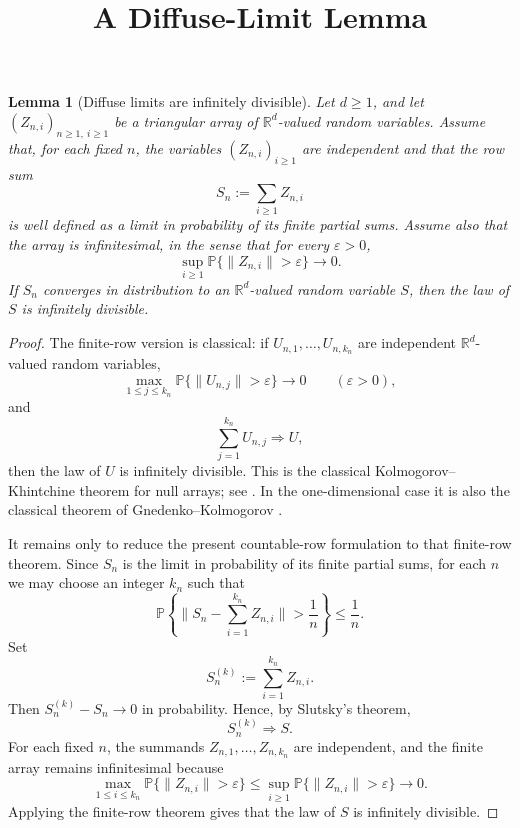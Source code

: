 \documentclass[11pt]{amsart}
\newtheorem{lemma}{Lemma}
\theoremstyle{remark}
\newcommand{\Prob}{\mathbb P}
\newcommand{\R}{\mathbb R}
\newcommand{\eps}{\varepsilon}
\newcommand{\norm}[1]{\lVert #1 \rVert}
\begin{document}

\title{A Diffuse-Limit Lemma}
\author{}
\date{}
\maketitle

\begin{lemma}[Diffuse limits are infinitely divisible]\label{lem:diffuse-id-limit}
Let $d\ge1$, and let $(Z_{n,i})_{n\ge1,\ i\ge1}$ be a triangular array of
$\R^d$-valued random variables.  Assume that, for each fixed $n$, the variables
$(Z_{n,i})_{i\ge1}$ are independent and that the row sum
\[
S_n:=\sum_{i\ge1} Z_{n,i}
\]
is well defined as a limit in probability of its finite partial sums.  Assume
also that the array is infinitesimal, in the sense that for every
$\eps>0$,
\[
\sup_{i\ge1}\Prob\{\norm{Z_{n,i}}>\eps\}\longrightarrow0.
\]
If $S_n$ converges in distribution to an $\R^d$-valued random variable $S$,
then the law of $S$ is infinitely divisible.
\end{lemma}

\begin{proof}
The finite-row version is classical: if
$U_{n,1},\dots,U_{n,k_n}$ are independent $\R^d$-valued random variables,
\[
\max_{1\le j\le k_n}\Prob\{\norm{U_{n,j}}>\eps\}\longrightarrow0
\qquad(\eps>0),
\]
and
\[
\sum_{j=1}^{k_n}U_{n,j}\Rightarrow U,
\]
then the law of $U$ is infinitely divisible.  This is the classical
Kolmogorov--Khintchine theorem for null arrays; see
\cite[Theorem~9.3]{sato-levy}.  In the one-dimensional case it is also the
classical theorem of Gnedenko--Kolmogorov
\cite[Chapter~IV, Section~24]{gnedenko-kolmogorov}.

It remains only to reduce the present countable-row formulation to that
finite-row theorem.  Since $S_n$ is the limit in probability of its finite
partial sums, for each $n$ we may choose an integer $k_n$ such that
\[
\Prob\left\{
\norm{S_n-\sum_{i=1}^{k_n}Z_{n,i}}>\frac1n
\right\}\le \frac1n.
\]
Set
\[
S_n^{(k)}:=\sum_{i=1}^{k_n}Z_{n,i}.
\]
Then $S_n^{(k)}-S_n\to0$ in probability.  Hence, by Slutsky's theorem,
\[
S_n^{(k)}\Rightarrow S.
\]
For each fixed $n$, the summands $Z_{n,1},\dots,Z_{n,k_n}$ are independent,
and the finite array remains infinitesimal because
\[
\max_{1\le i\le k_n}\Prob\{\norm{Z_{n,i}}>\eps\}
\le
\sup_{i\ge1}\Prob\{\norm{Z_{n,i}}>\eps\}
\longrightarrow0.
\]
Applying the finite-row theorem gives that the law of $S$ is infinitely
divisible.
\end{proof}
\end{document}
